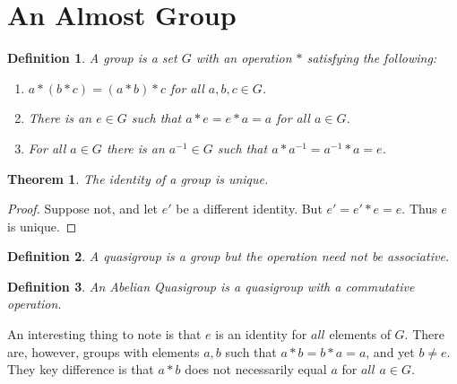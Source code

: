 \documentclass[oneside]{book}
\theoremstyle{mystyle}
\newtheorem{theorem}{Theorem}[section]
\newtheorem{definition}{Definition}[section]
\begin{document}
\section{An Almost Group}
%
\begin{definition}
A group is a set $G$ with an operation $*$ satisfying the following:
\begin{enumerate}
\item $a*(b*c) = (a*b)*c$ for all $a,b,c\in G$.
\item There is an $e\in G$ such that $a*e=e*a = a$ for all $a\in G$.
\item For all $a\in G$ there is an $a^{-1}\in G$ such that $a*a^{-1}=a^{-1}*a = e$.
\end{enumerate}
\end{definition}

\begin{theorem}
The identity of a group is unique.
\end{theorem}
\begin{proof}
Suppose not, and let $e'$ be a different identity. But $e' = e'*e = e$. Thus $e$ is unique.
\end{proof}

\begin{definition}
A quasigroup is a group but the operation need not be associative.
\end{definition}

\begin{definition}
An Abelian Quasigroup is a quasigroup with a commutative operation.
\end{definition}

An interesting thing to note is that $e$ is an identity for $all$ elements of $G$. There are, however, groups with elements $a,b$ such that $a*b = b*a = a$, and yet $b\ne e$. They key difference is that $a*b$ does not necessarily equal $a$ for $all$ $a\in G$. 
\end{document}
